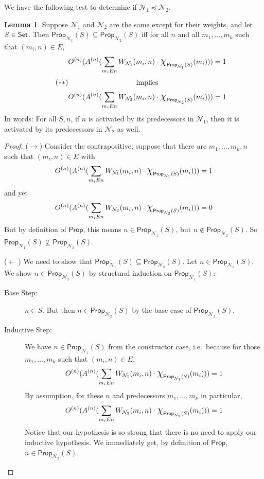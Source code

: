 \documentclass[letterpaper]{article}
\theoremstyle{definition}
\newtheorem{lemma}[theorem]{Lemma}
\newcommand{\Set}{\mbox{\sf Set}}
\newcommand{\set}[1]{\{ #1 \}}
\newcommand*{\bigchi}{\mbox{\Large$\chi$}}%
\newcommand{\Prop}{\textsf{Prop}}
\newcommand{\Net}{\mathcal{N}}
\begin{document}
We have the following test to determine if $\Net_1 \preceq \Net_2$.
\begin{lemma}
\label{lemma:subnet->leq}
Suppose $\Net_1$ and $\Net_2$ are the same except for their weights, and let $S \in \Set$.  Then ${\Prop_{\Net_1}(S) \subseteq \Prop_{\Net_2}(S)}$ iff for all $n$ and all $m_1, \ldots, m_k$ such that $(m_i, n) \in E$,
\begin{equation}\tag{$\ast\ast$}
\label{eqn:weight-condition}
  \begin{gathered}
    O^{(n)}(A^{(n)}(\sum_{m_i{E}n} W_{\Net_1}(m_i, n) \cdot \bigchi_{\Prop_{\Net_1}(S)}(m_i))) = 1 \\
    \mbox{implies} \\
    O^{(n)}(A^{(n)}(\sum_{m_i{E}n} W_{\Net_2}(m_i, n) \cdot \bigchi_{\Prop_{\Net_2}(S)}(m_i))) = 1
  \end{gathered}
\end{equation}
In words: For all $S, n$, if $n$ is activated by its predecessors in $\Net_1$, then it is activated by its predecessors in $\Net_2$ as well.
\end{lemma}
\begin{proof}
($\rightarrow$) Consider the contrapositive; suppose that there are $m_1, \ldots, m_k, n$ such that $(m_i, n) \in E$ with
\[
O^{(n)}(A^{(n)}(\sum_{m_i{E}n} W_{\Net_1}(m_i, n) \cdot \bigchi_{\Prop_{\Net_1}(S)}(m_i))) = 1
\]
and yet
\[
O^{(n)}(A^{(n)}(\sum_{m_i{E}n} W_{\Net_2}(m_i, n) \cdot \bigchi_{\Prop_{\Net_2}(S)}(m_i))) = 0
\]
But by definition of $\Prop$, this means $n \in \Prop_{\Net_1}(S)$, but $n \not \in \Prop_{\Net_2}(S)$.  So $\Prop_{\Net_1}(S) \not \subseteq \Prop_{\Net_2}(S)$.


($\leftarrow$) We need to show that $\Prop_{\Net_1}(S) \subseteq \Prop_{\Net_2}(S)$. Let $n \in \Prop_{\Net_1}(S)$. We show $n \in \Prop_{\Net_2}(S)$ by structural induction on $\Prop_{\Net_1}(S)$:

\begin{description}
\item[Base Step:] $n \in S$. But then $n \in \Prop_{\Net_2}(S)$ by the base case of $\Prop_{\Net_2}(S)$.

\item[Inductive Step:]
We have $n \in \Prop_{\Net_1}(S)$ from the constructor case, i.e.\ because for those $m_1, \ldots, m_k$ such that $(m_i, n) \in E$,
\[
O^{(n)}(A^{(n)}(\sum_{m_i{E}n} W_{\Net_1}(m_i, n) \cdot \bigchi_{\Prop_{\Net_1}(S)}(m_i))) = 1
\]
By assumption, for these $n$ and predecessors $m_1, \ldots, m_k$ in particular,
\[
O^{(n)}(A^{(n)}(\sum_{m_i{E}n} W_{\Net_2}(m_i, n) \cdot \bigchi_{\Prop_{\Net_2}(S)}(m_i))) = 1
\]
Notice that our hypothesis is so strong that there is no need to apply our inductive hypothesis. We immediately get, by definition of $\Prop$, $n \in \Prop_{\Net_2}(S)$. \qedhere
\end{description}
\end{proof}
\end{document}
